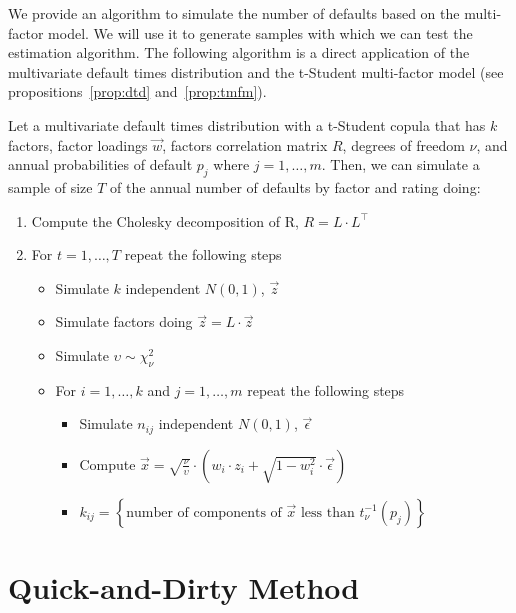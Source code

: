 \documentclass[11pt,fleqn]{book} %
\begin{document}
We provide an algorithm to simulate the number of defaults based on
the multi-factor model. We will use it to generate samples with which 
we can test the estimation algorithm. The following algorithm is 
a direct application of the multivariate default times distribution
and the t-Student multi-factor model (see propositions~\ref{prop:dtd} 
and~\ref{prop:tmfm}).

\begin{algorithm}
	\label{alg:snod}
	Let a multivariate default times distribution with a t-Student copula
	that has $k$ factors, factor loadings $\vec{w}$, factors correlation 
	matrix $R$, degrees of freedom $\nu$, and annual probabilities of
	default $p_j$ where $j=1,\dots,m$. Then, we can simulate a sample of 
	size $T$ of the annual number of defaults by factor and rating doing:
	\begin{enumerate}
		\item Compute the Cholesky decomposition of R, $R = L \cdot L^\intercal$
		\item For $t=1,\dots,T$ repeat the following steps
		\begin{itemize}
			\item Simulate $k$ independent $N(0,1)$, $\vec{z}$
			\item Simulate factors doing $\vec{z} = L \cdot \vec{z}$
			\item Simulate $\upsilon \sim \chi_{\nu}^2$
			\item For $i=1,\dots,k$ and $j=1,\dots,m$ repeat the following steps
			\begin{itemize}
				\item Simulate $n_{ij}$ independent $N(0,1)$, $\vec{\epsilon}$
				\item Compute $\vec{x} = \sqrt{\frac{\nu}{\upsilon}} \cdot \left( w_i \cdot z_i + \sqrt{1-w_i^2} \cdot \vec{\epsilon} \right)$
				\item $k_{ij} = \left\{ \text{number of components of $\vec{x}$ less than $t_{\nu}^{-1}(p_j)$} \right\} $
			\end{itemize}
		\end{itemize}
	\end{enumerate}
\end{algorithm}

\section{Quick-and-Dirty Method}
\end{document}
